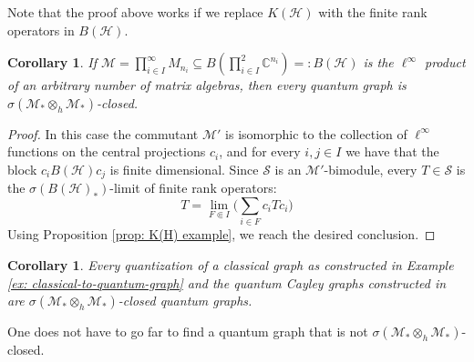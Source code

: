 \documentclass[12pt]{article}
\newtheorem{corollary}[theorem]{Corollary}
\theoremstyle{definition}
\newenvironment{remark}
  {\pushQED{\qed}\renewcommand{\qedsymbol}{\textcircled{\tiny R}}\remarkx}
  {\popQED\endremarkx}
\newcommand{\C}{\mathbb C}
\newcommand{\mc}[1]{\mathcal{#1}}
\newcommand{\<}{\langle}
\renewcommand{\>}{\rangle}
\renewcommand{\subset}{\subseteq}
\newcommand{\h}{\otimes_{h}}
\begin{document}
\begin{remark}
    Note that the proof above works if we replace $K(\mc H)$ with the finite rank operators in $B(\mc H)$.
\end{remark}

\begin{corollary} \label{cor: K(H)graphex}
    If $\mc M = \prod_{i \in I}^\infty M_{n_i} \subset B(\prod_{i \in I}^{2} \C^{n_i}) =: B(\mc H)$ is the $\ell^\infty$ product of an arbitrary number of matrix algebras, then every quantum graph is $\sigma(\mc M_* \h \mc M_*)$-closed.
\end{corollary}
\begin{proof}
     In this case the commutant $\mc M'$ is isomorphic to the collection of $\ell^\infty$ functions on the central projections $c_i$, and for every $i,j \in I$ we have that the block $c_i B(\mc H) c_j$ is finite dimensional. Since $\mc S$ is an $\mc M'$-bimodule, every $T \in \mc S$ is the $\sigma(B(\mc H)_*)$-limit of finite rank operators:
    \[
    T = \lim_{F \Subset I} \bigg(\sum_{i \in F} c_iTc_i\bigg)
    \]
    Using Proposition \ref{prop: K(H) example}, we reach the desired conclusion.
\end{proof}

\begin{corollary}
     Every quantization of a classical graph as constructed in Example \ref{ex: classical-to-quantum-graph} and the quantum Cayley graphs constructed in \cite{quantum-cayley} are $\sigma(\mc M_* \h \mc M_*)$-closed quantum graphs.
\end{corollary}

One does not have to go far to find a quantum graph that is not $\sigma(\mc M_* \h \mc M_*)$-closed.
\end{document}
